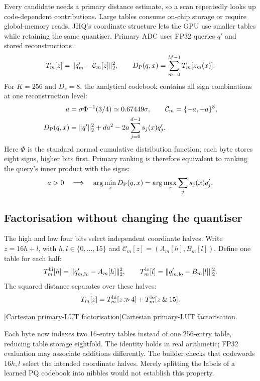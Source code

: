 Every candidate needs a primary distance estimate, so a scan repeatedly
looks up code-dependent contributions. Large tables consume on-chip
storage or require global-memory reads. JHQ's coordinate structure lets
the GPU use smaller tables while retaining the same quantiser. Primary
ADC uses FP32 queries $q'$ and stored reconstructions \cite{pq,jhq}:
\begin{equation}
 T_m[z]=\|q'_m-\mathcal C_m[z]\|_2^2,\qquad
 D_{\mathrm{P}}(q,x)=\sum_{m=0}^{M-1}T_m[z_m(x)].
 \label{eq:5-primary-lut}
\end{equation}
For $K=256$ and $D_s=8$, the analytical codebook contains all sign
combinations at one reconstruction level:
\begin{equation}
 \begin{aligned}
 a&=\sigma\Phi^{-1}(3/4)\simeq0.67449\sigma,\qquad
 \mathcal C_m=\{-a,+a\}^{8},\\
 D_{\mathrm{P}}(q,x)&=\|q'\|_2^2+da^2
       -2a\sum_{j=0}^{d-1}s_j(x)q'_j.
 \end{aligned}
 \label{eq:5-sign-codebook}
\end{equation}
Here $\Phi$ is the standard normal cumulative distribution function;
each byte stores eight signs, higher bits first. Primary ranking is
therefore equivalent to ranking the query's inner product with the signs:
\[
 a>0\quad\Longrightarrow\quad
 \arg\min_xD_{\mathrm{P}}(q,x)=\arg\max_x\sum_j s_j(x)q'_j.
\]

\subsection{Factorisation without changing the quantiser}

The high and low four bits select independent coordinate halves. Write
$z=16h+l$, with $h,l\in\{0,\ldots,15\}$ and
$\mathcal C_m[z]=(A_m[h],B_m[l])$. Define one table for each half:
\begin{equation}
 T_m^{\rm hi}[h]=\|q'_{m,\rm hi}-A_m[h]\|_2^2,\qquad
 T_m^{\rm lo}[l]=\|q'_{m,\rm lo}-B_m[l]\|_2^2.
 \label{eq:5-lut-halves}
\end{equation}
The squared distance separates over these halves:
\begin{equation}
 T_m[z]=T_m^{\rm hi}[z\!\gg\!4]
        +T_m^{\rm lo}[z\mathbin{\&}15].
 \label{eq:5-lut-factorisation}
\end{equation}
\par\medskip\noindent\begin{minipage}{\linewidth}
\captionsetup{hypcap=false}
\centering

[Cartesian primary-LUT factorisation]{Cartesian primary-LUT factorisation.}
\label{fig:5-cartesian-lut}
\end{minipage}\par\medskip
Each byte now indexes two 16-entry tables instead of one 256-entry
table, reducing table storage eightfold. The identity holds in real
arithmetic; FP32 evaluation may associate additions differently. The
builder checks that codewords $16h,l$ select the intended coordinate
halves. Merely splitting the labels of a learned PQ codebook into
nibbles would not establish this property.

